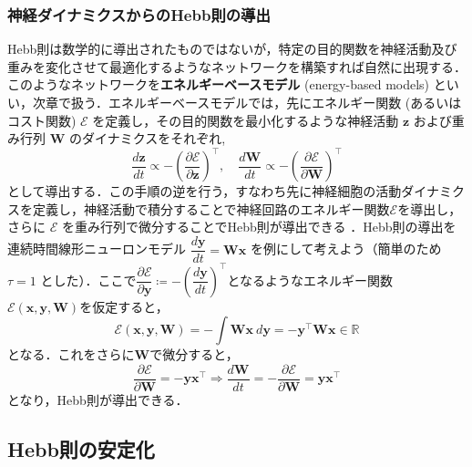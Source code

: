 \subsubsection{神経ダイナミクスからのHebb則の導出}
Hebb則は数学的に導出されたものではないが，特定の目的関数を神経活動及び重みを変化させて最適化するようなネットワークを構築すれば自然に出現する．このようなネットワークを\textbf{エネルギーベースモデル} (energy-based models) といい，次章で扱う．エネルギーベースモデルでは，先にエネルギー関数 (あるいはコスト関数) $\mathcal{E}$ を定義し，その目的関数を最小化するような神経活動 $\mathbf{z}$ および重み行列 $\mathbf{W}$ のダイナミクスをそれぞれ,
\begin{equation}
\frac{d \mathbf{z}}{dt}\propto-\left(\frac{\partial \mathcal{E}}{\partial \mathbf{z}}\right)^\top,\quad\frac{d \mathbf{W}}{dt}\propto-\left(\frac{\partial \mathcal{E}}{\partial \mathbf{W}}\right)^\top
\end{equation}
として導出する．この手順の逆を行う，すなわち先に神経細胞の活動ダイナミクスを定義し，神経活動で積分することで神経回路のエネルギー関数$\mathcal{E}$を導出し，さらに $\mathcal{E}$ を重み行列で微分することでHebb則が導出できる \citep{Isomura2020-sn}．Hebb則の導出を連続時間線形ニューロンモデル $\dfrac{d\mathbf{y}}{dt}=\mathbf{W}\mathbf{x}$ を例にして考えよう（簡単のため $\tau=1$ とした）．ここで$\dfrac{\partial\mathcal{E}}{\partial\mathbf{y}}\coloneqq -\left(\dfrac{d\mathbf{y}}{dt}\right)^\top$となるようなエネルギー関数 $\mathcal{E}(\mathbf{x}, \mathbf{y}, \mathbf{W})$を仮定すると，
\begin{equation}
\mathcal{E}(\mathbf{x}, \mathbf{y}, \mathbf{W})=-\int \mathbf{W}\mathbf{x}\ d\mathbf{y}=-\mathbf{y}^\top \mathbf{W}\mathbf{x} \in \mathbb{R}
\end{equation}
となる．これをさらに$\mathbf{W}$で微分すると，
\begin{equation}
\dfrac{\partial\mathcal{E}}{\partial\mathbf{W}}=-\mathbf{y}\mathbf{x}^\top\Rightarrow
\frac{d\mathbf{W}}{dt}=-\dfrac{\partial\mathcal{E}}{\partial\mathbf{W}}=\mathbf{y}\mathbf{x}^\top
\end{equation}
となり，Hebb則が導出できる．
\subsection{Hebb則の安定化}
